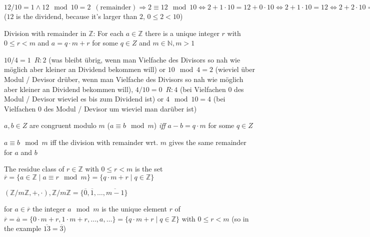 \documentclass[landscape, a4paper]{article}
\begin{document}
\begin{minipage}[t]{0.198\pagewidth}
	\begin{betterlist}
		\item $\boxed{12 / 10 = 1 \wedge 12 \mod 10 = 2 \enspace(\text{remainder})} \Rightarrow 2 \equiv 12 \mod 10 \Leftrightarrow 2 + 1 \cdot 10 = 12 + 0 \cdot 10 \Leftrightarrow \boxed{2 + 1 \cdot 10 = 12}\Leftrightarrow 2 + 2 \cdot 10 = 12 + 1 \cdot 10$ ($12$ is the dividend, because it's larger than $2$, $0\le 2< 10$)
		\item \alert{Division with remainder in $\mathbb{Z}$:} For each $a \in \mathbb{Z}$ there is a unique integer $r$ with $0 \le r < m$ and $a = q \cdot m + r$ for some $q \in Z$ and $m \in \mathbb{N}, m > 1$
		\begin{betterlist}
			\item $10 / 4 = 1\enspace R:2$ (was bleibt übrig, wenn man Vielfache des Divisors so nah wie möglich aber kleiner an Dividend bekommen will) or $10 \mod 4 = 2$ (wieviel über Modul / Devisor drüber, wenn man Vielfache des Divisors so nah wie möglich aber kleiner an Dividend bekommen will), $4 / 10 = 0\enspace R:4$ (bei Vielfachen $0$ des Modul / Devisor  wieviel es bis zum Dividend ist) or $4 \mod 10 = 4$ (bei Vielfachen $0$ des Modul / Devisor um wieviel man darüber ist)
		\end{betterlist}
		\item $a, b \in Z$ are \alert{congruent modulo} $m$ ($a \equiv b \mod m$) \textit{iff} $a - b = q \cdot m$ for some $q \in Z$
		\begin{betterlist}
			\item $a \equiv b \mod m$ iff the division with remainder wrt. $m$ gives the same remainder for $a$ and $b$
		\end{betterlist}
		\item The \alert{residue class} of $r \in \mathbb{Z}$ with $0 \le r < m$ is the set $\overline{r} = \{a \in \mathbb{Z} \mid a \equiv r \mod m\} = \{q \cdot m + r \mid q \in \mathbb{Z}\}$
		\begin{betterlist}
			\item $(\mathbb{Z}/m\mathbb{Z}, +, \cdot), \mathbb{Z}/m\mathbb{Z} = \{\overline{0}, \overline{1}, \ldots, \overline{m-1}\}$
			\item for $a \in \overline{r}$ the integer $a \mod m$ is the unique element $r$ of $\overline{r}=\overline{a}=\{0\cdot m + r, 1\cdot m + r, \ldots, a,\ldots\}=\{q\cdot m + r \mid q\in\mathbb{Z}\}$ with $0 \le r < m$ (so in the example $\overline{13} = \overline{3}$)

\end{betterlist}
\end{betterlist}
\end{minipage}
\end{document}
